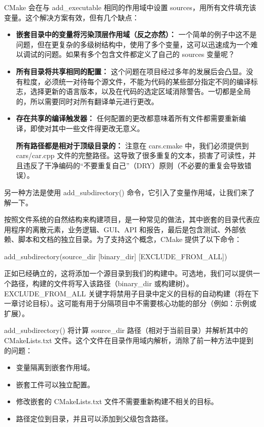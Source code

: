 CMake 会在与 add\_executable 相同的作用域中设置 sources，用所有文件填充该变量。这个解决方案有效，但有几个缺点：

\begin{itemize}
\item
\textbf{嵌套目录中的变量将污染顶层作用域（反之亦然）：} 一个简单的例子中这不是问题，但在更复杂的多级树结构中，使用了多个变量，这可以迅速成为一个难以调试的问题。如果有多个包含文件都定义了自己的 sources 变量呢？

\item
\textbf{所有目录将共享相同的配置：} 这个问题在项目经过多年的发展后会凸显。没有粒度，必须统一对待每个源文件，不能为代码的某些部分指定不同的编译标志，选择更新的语言版本，以及在代码的选定区域消除警告。一切都是全局的，所以需要同时对所有翻译单元进行更改。

\item
\textbf{存在共享的编译触发器：} 任何配置的更改都意味着所有文件都需要重新编译，即使对其中一些文件得更改无意义。

\textbf{所有路径都是相对于顶级目录的：} 注意在 cars.cmake 中，我们必须提供到 cars/car.cpp 文件的完整路径。这导致了很多重复的文本，损害了可读性，并且违反了干净编码的“不要重复自己”（DRY）原则（不必要的重复会导致错误）。
\end{itemize}

另一种方法是使用 add\_subdirectory() 命令，它引入了变量作用域，让我们来了解一下。


按照文件系统的自然结构来构建项目，是一种常见的做法，其中嵌套的目录代表应用程序的离散元素，业务逻辑、GUI、API 和报告，最后是包含测试、外部依赖、脚本和文档的独立目录。为了支持这个概念，CMake 提供了以下命令：

\begin{shell}
add_subdirectory(source_dir [binary_dir] [EXCLUDE_FROM_ALL])
\end{shell}

正如已经确立的，这将添加一个源目录到我们的构建中。可选地，我们可以提供一个路径，构建的文件将写入该路径（binary\_dir 或构建树）。EXCLUDE\_FROM\_ALL 关键字将禁用子目录中定义的目标的自动构建（将在下一章讨论目标）。这可能有用于分隔项目中不需要核心功能的部分（例如：示例或扩展）。

add\_subdirectory() 将计算 source\_dir 路径（相对于当前目录）并解析其中的 CMakeLists.txt 文件。这个文件在目录作用域内解析，消除了前一种方法中提到的问题：

\begin{itemize}
\item
变量隔离到嵌套作用域。

\item
嵌套工件可以独立配置。

\item
修改嵌套的 CMakeLists.txt 文件不需要重新构建不相关的目标。

\item
路径定位到目录，并且可以添加到父级包含路径。
\end{itemize}


